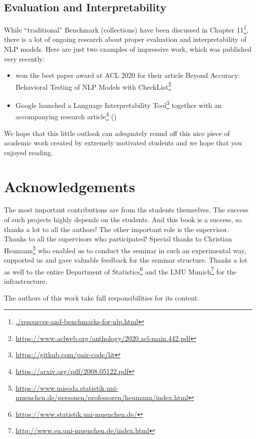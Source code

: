 \documentclass[]{krantz}
\providecommand{\tightlist}{%
  \setlength{\itemsep}{0pt}\setlength{\parskip}{0pt}}
\renewcommand{\href}[2]{#2\footnote{\url{#1}}}
\begin{document}
\hypertarget{evaluation-and-interpretability}{%
\section{Evaluation and Interpretability}\label{evaluation-and-interpretability}}

While ``traditional'' Benchmark (collections) have been discussed in \href{./resources-and-benchmarks-for-nlp.html}{Chapter 11}, there is a lot of ongoing research about proper evaluation and interpretability of NLP models. Here are just two examples of impressive work, which was published very recently:

\begin{itemize}
\tightlist
\item
  \citet{ribeiro-etal-2020-beyond} won the best paper award at ACL 2020 for their article \href{https://www.aclweb.org/anthology/2020.acl-main.442.pdf}{Beyond Accuracy: Behavioral Testing of NLP Models with CheckList}
\item
  Google launched a \href{https://github.com/pair-code/lit}{Language Interpretability Tool} together with an accompanying \href{https://arxiv.org/pdf/2008.05122.pdf}{research article} (\citet{tenney2020language})
\end{itemize}

We hope that this little outlook can adequately round off this nice piece of academic work created by extremely motivated students and we hope that you enjoyed reading.

\hypertarget{acknowledgements}{%
\chapter{Acknowledgements}\label{acknowledgements}}

The most important contributions are from the students themselves.
The success of such projects highly depends on the students.
And this book is a success, so thanks a lot to all the authors!
The other important role is the supervisor.
Thanks to all the supervisors who participated!
Special thanks to \href{https://www.misoda.statistik.uni-muenchen.de/personen/professoren/heumann/index.html}{Christian Heumann} who enabled us to conduct the seminar in such an experimental way, supported us and gave valuable feedback for the seminar structure.
Thanks a lot as well to the entire \href{https://www.statistik.uni-muenchen.de/}{Department of Statistics} and the \href{http://www.en.uni-muenchen.de/index.html}{LMU Munich} for the infrastructure.

The authors of this work take full responsibilities for its content.



\backmatter
\printindex
\end{document}
